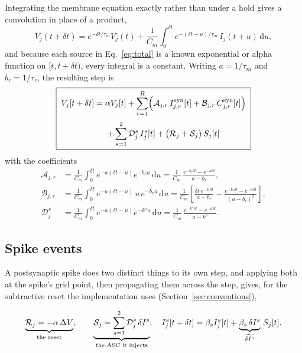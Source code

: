 \documentclass[11pt,a4paper,numbers=noenddot]{scrartcl}
\newcommand{\dt}{\delta t}
\newcommand{\Isyn}{I^{\mathrm{syn}}}
\newcommand{\Csyn}{C^{\mathrm{syn}}}
\newcommand{\amem}{\alpha}
\newcommand{\Acoef}{\mathcal{A}}
\newcommand{\Bcoef}{\mathcal{B}}
\newcommand{\Dcoef}{\mathcal{D}}
\newcommand{\Rcoef}{\mathcal{R}}
\newcommand{\Scoef}{\mathcal{S}}
\begin{document}
Integrating the membrane equation exactly rather than under a hold gives a
convolution in place of a product,
%
\begin{equation}
\label{eq:convolution}
V_j(t+\dt) = e^{-\dt/\tau_m} V_j(t)
  + \frac{1}{C_m}\int_{0}^{\dt}
      e^{-(\dt-u)/\tau_m}\, I_j(t+u)\,\mathrm{d}u,
\end{equation}
%
and because each source in Eq.~\eqref{eq:total} is a known exponential or
alpha function on $[t,t+\dt)$, every integral is a constant. Writing
$a = 1/\tau_m$ and $b_r = 1/\tau_r$, the resulting step is
%
\begin{equation}
\label{eq:exact-v}
\boxed{\;
\begin{aligned}
V_j[t+\dt] = {} & \amem V_j[t]
  + \sum_{r=1}^{R}\Bigl(\Acoef_{j,r}\,\Isyn_{j,r}[t]
                      + \Bcoef_{j,r}\,\Csyn_{j,r}[t]\Bigr) \\[0.2em]
  & + \sum_{s=1}^{2}\Dcoef^{s}_{j}\,I^{s}_j[t]
  + \bigl(\Rcoef_j + \Scoef_j\bigr)\, S_j[t]
\end{aligned}\;}
\end{equation}
%
with the coefficients
%
\begin{align}
\label{eq:coefA}
\Acoef_{j,r} &= \frac{1}{C_m}\int_0^{\dt} e^{-a(\dt-u)}e^{-b_r u}\,\mathrm{d}u
   = \frac{1}{C_m}\,\frac{e^{-b_r \dt} - e^{-a\dt}}{a - b_r},
\\
\label{eq:coefB}
\Bcoef_{j,r} &= \frac{1}{C_m}\int_0^{\dt} e^{-a(\dt-u)}\,u\,e^{-b_r u}\,\mathrm{d}u
   = \frac{1}{C_m}\left[\frac{\dt\,e^{-b_r\dt}}{a-b_r}
     - \frac{e^{-b_r\dt}-e^{-a\dt}}{(a-b_r)^{2}}\right],
\\
\label{eq:coefD}
\Dcoef^{s}_{j} &= \frac{1}{C_m}\int_0^{\dt} e^{-a(\dt-u)}e^{-k^{s}u}\,\mathrm{d}u
   = \frac{1}{C_m}\,\frac{e^{-k^{s}\dt} - e^{-a\dt}}{a - k^{s}} .
\end{align}

\subsection{Spike events}

A postsynaptic spike does two distinct things to its own step, and applying
both at the spike's grid point, then propagating them across the step,
gives, for the subtractive reset the implementation uses
(Section~\ref{sec:conventions}),

\begin{equation}
\label{eq:events}
\underbrace{\Rcoef_j = -\amem\,\Delta V}_{\text{the reset}},
\qquad
\underbrace{\Scoef_j = \sum_{s=1}^{2}\Dcoef^{s}_{j}\,\delta I^{s}}_{%
  \text{the ASC it injects}},
\quad
I^{s}_j[t+\dt] = \beta_s I^{s}_j[t]
  + \underbrace{\beta_s\,\delta I^{s}}_{\widetilde{\delta I^{s}}}\,S_j[t].
\end{equation}
\end{document}
